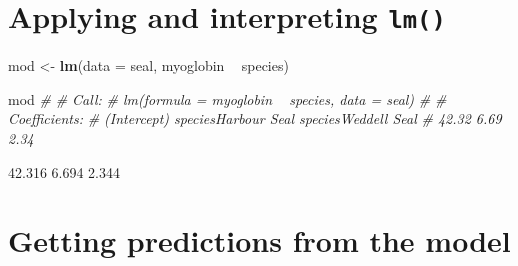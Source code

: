 \documentclass[
]{book}
\newenvironment{Shaded}{\begin{snugshade}}{\end{snugshade}}
\newcommand{\CommentTok}[1]{\textcolor[rgb]{0.56,0.35,0.01}{\textit{#1}}}
\newcommand{\DataTypeTok}[1]{\textcolor[rgb]{0.13,0.29,0.53}{#1}}
\newcommand{\KeywordTok}[1]{\textcolor[rgb]{0.13,0.29,0.53}{\textbf{#1}}}
\newcommand{\NormalTok}[1]{#1}
\newcommand{\OperatorTok}[1]{\textcolor[rgb]{0.81,0.36,0.00}{\textbf{#1}}}
\newcommand{\StringTok}[1]{\textcolor[rgb]{0.31,0.60,0.02}{#1}}
\begin{document}
\hypertarget{applying-and-interpreting-lm-2}{%
\section{\texorpdfstring{Applying and interpreting \texttt{lm()}}{Applying and interpreting lm()}}\label{applying-and-interpreting-lm-2}}

\begin{Shaded}
\begin{Highlighting}[]
\NormalTok{mod <-}\StringTok{ }\KeywordTok{lm}\NormalTok{(}\DataTypeTok{data =}\NormalTok{ seal, myoglobin }\OperatorTok{~}\StringTok{ }\NormalTok{species)}
\end{Highlighting}
\end{Shaded}

\begin{Shaded}
\begin{Highlighting}[]
\NormalTok{mod}
\CommentTok{# }
\CommentTok{# Call:}
\CommentTok{# lm(formula = myoglobin ~ species, data = seal)}
\CommentTok{# }
\CommentTok{# Coefficients:}
\CommentTok{#         (Intercept)  speciesHarbour Seal  speciesWeddell Seal  }
\CommentTok{#               42.32                 6.69                 2.34}
\end{Highlighting}
\end{Shaded}

\begin{Shaded}
\end{Shaded}

42.316
6.694
2.344

\hypertarget{getting-predictions-from-the-model-2}{%
\section{Getting predictions from the model}\label{getting-predictions-from-the-model-2}}

\begin{Shaded}
\end{Shaded}

\begin{Shaded}
\end{Shaded}
\end{document}

